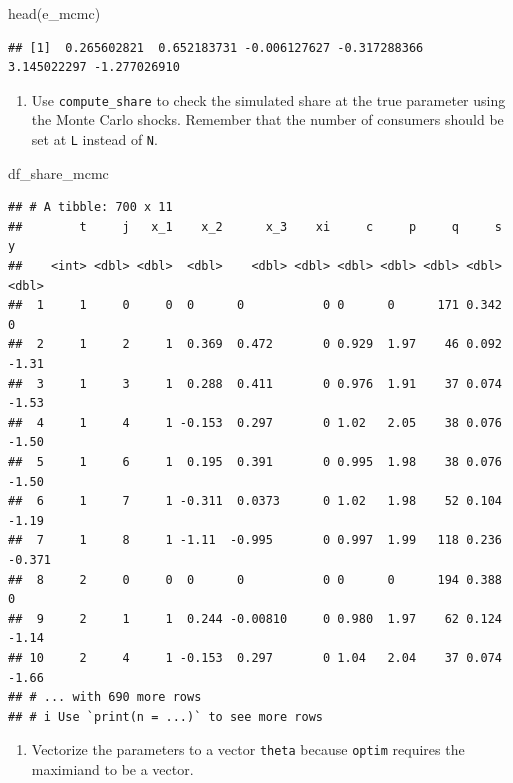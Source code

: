 \documentclass[
]{book}
\newenvironment{Shaded}{\begin{snugshade}}{\end{snugshade}}
\newcommand{\FunctionTok}[1]{\textcolor[rgb]{0.00,0.00,0.00}{#1}}
\newcommand{\NormalTok}[1]{#1}
\providecommand{\tightlist}{%
  \setlength{\itemsep}{0pt}\setlength{\parskip}{0pt}}
\begin{document}
\begin{Shaded}
\begin{Highlighting}[]
\FunctionTok{head}\NormalTok{(e\_mcmc)}
\end{Highlighting}
\end{Shaded}

\begin{verbatim}
## [1]  0.265602821  0.652183731 -0.006127627 -0.317288366  3.145022297 -1.277026910
\end{verbatim}

\begin{enumerate}
\def\labelenumi{\arabic{enumi}.}
\setcounter{enumi}{2}
\tightlist
\item
  Use \texttt{compute\_share} to check the simulated share at the true parameter using the Monte Carlo shocks. Remember that the number of consumers should be set at \texttt{L} instead of \texttt{N}.
\end{enumerate}

\begin{Shaded}
\begin{Highlighting}[]
\NormalTok{df\_share\_mcmc}
\end{Highlighting}
\end{Shaded}

\begin{verbatim}
## # A tibble: 700 x 11
##        t     j   x_1    x_2      x_3    xi     c     p     q     s      y
##    <int> <dbl> <dbl>  <dbl>    <dbl> <dbl> <dbl> <dbl> <dbl> <dbl>  <dbl>
##  1     1     0     0  0      0           0 0      0      171 0.342  0    
##  2     1     2     1  0.369  0.472       0 0.929  1.97    46 0.092 -1.31 
##  3     1     3     1  0.288  0.411       0 0.976  1.91    37 0.074 -1.53 
##  4     1     4     1 -0.153  0.297       0 1.02   2.05    38 0.076 -1.50 
##  5     1     6     1  0.195  0.391       0 0.995  1.98    38 0.076 -1.50 
##  6     1     7     1 -0.311  0.0373      0 1.02   1.98    52 0.104 -1.19 
##  7     1     8     1 -1.11  -0.995       0 0.997  1.99   118 0.236 -0.371
##  8     2     0     0  0      0           0 0      0      194 0.388  0    
##  9     2     1     1  0.244 -0.00810     0 0.980  1.97    62 0.124 -1.14 
## 10     2     4     1 -0.153  0.297       0 1.04   2.04    37 0.074 -1.66 
## # ... with 690 more rows
## # i Use `print(n = ...)` to see more rows
\end{verbatim}

\begin{enumerate}
\def\labelenumi{\arabic{enumi}.}
\setcounter{enumi}{4}
\tightlist
\item
  Vectorize the parameters to a vector \texttt{theta} because \texttt{optim} requires the maximiand to be a vector.
\end{enumerate}
\end{document}
